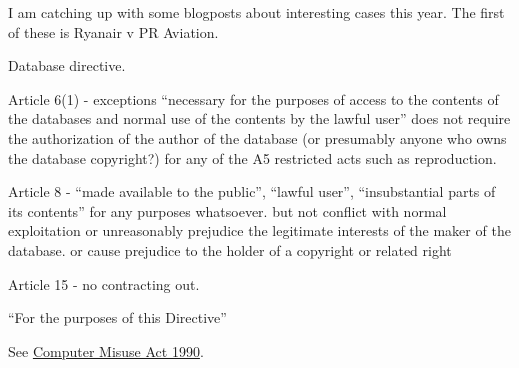 I am catching up with some blogposts about interesting cases this year. The first of these is Ryanair v PR Aviation.

Database directive.

Article 6(1) - exceptions ``necessary for the purposes of access to the contents of the databases and normal use of the contents by the lawful user'' does not require the authorization of the author of the database (or presumably anyone who owns the database copyright?) for any of the A5 restricted acts such as reproduction.

Article 8 - ``made available to the public'', ``lawful user'', ``insubstantial parts of its contents'' for any purposes whatsoever. but not conflict with normal exploitation or unreasonably prejudice the legitimate interests of the maker of the database. or cause prejudice to the holder of a copyright or related right 

Article 15 - no contracting out.

``For the purposes of this Directive''

See \href{http://www.legislation.gov.uk/ukpga/1990/18/contents}{Computer Misuse Act 1990}.


